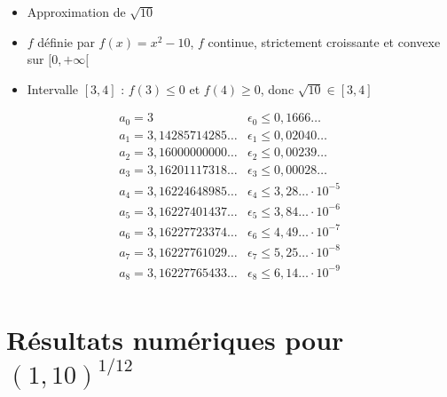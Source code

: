 \begin{frame}
\begin{itemize}
  \item Approximation de $\sqrt{10}$

\pause

  \item $f$ définie par $f(x)=x^2 - 10$, $f$ continue, strictement croissante et convexe sur $[0,+\infty[$

\pause

  \item Intervalle $[3,4]$ : $f(3) \le 0$ et $f(4) \ge 0$, donc $\sqrt{10} \in [3,4]$
\end{itemize}

\pause

$$
\begin{array}{l|l}
  a_0 = 3                          & \epsilon_0 \le 0,1666\ldots \\
  a_1 = 3,14285714285\ldots    & \epsilon_1 \le 0,02040\ldots \\
  a_2 = 3,16000000000\ldots    & \epsilon_2 \le 0,00239\ldots \\
  a_3 = 3,16201117318\ldots   & \epsilon_3 \le 0,00028\ldots \\
  a_4 = 3,16224648985\ldots   & \epsilon_4 \le 3,28\ldots \cdot 10^{-5} \\
  a_5 = 3,16227401437\ldots    & \epsilon_5 \le 3,84\ldots \cdot 10^{-6}\\
  a_6 = 3,16227723374\ldots    & \epsilon_6 \le 4,49\ldots \cdot 10^{-7} \\
  a_7 = 3,16227761029\ldots   & \epsilon_7 \le 5,25\ldots \cdot 10^{-8} \\
  a_8 = 3,16227765433\ldots   & \epsilon_8 \le 6,14\ldots \cdot 10^{-9} \\
\end{array}
$$
\end{frame}



\section{Résultats numériques pour $(1,10)^{1/12}$}


